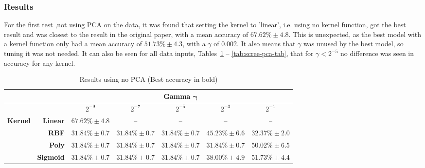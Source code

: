 \documentclass[12pt,a4paper,titlepage,twoside]{report}
\begin{document}
\subsubsection*{Results}
	For the first test ,not using PCA on the data, it was found that setting the kernel to 'linear', i.e. using no kernel function, got the best result and was closest to the result in the original paper, with a mean accuracy of $67.62\% \pm4.8$. This is unexpected, as the best model with a kernel function only had a mean accuracy of $51.73\% \pm4.3$, with a $\gamma$ of 0.002. It also means that $\gamma$ was unused by the best model, so tuning it was not needed. It can also be seen for all data inputs, Tables~\ref{tab:no-pca-tab} -- \ref{tab:scree-pca-tab}, that for $\gamma < 2^{-5}$ no difference was seen in accuracy for any kernel.\\
	\begin{table}[h]
		\centering
		\begin{tabular}{|ll|ccccc|}
			\hline
                                      &                                      &   			& \multicolumn{3}{c}{\textbf{Gamma $\boldsymbol{\gamma}$}} &   \\ \hline
                                      &                                      				& $2^{-9}$  		& $2^{-7}$       	& $2^{-5}$      	& $2^{-3}$			& $2^{-1}$ \\ \hline
			\multicolumn{1}{|l|}{\textbf{Kernel}} & \multicolumn{1}{r|}{\textbf{Linear}} 	& \boldmath$67.62\% \pm4.8$ 	& --  	& --				& --	  			& --			   \\
			\multicolumn{1}{|l|}{\textbf{}}       & \multicolumn{1}{r|}{\textbf{RBF}}    	& $31.84\% \pm0.7$ 	& $31.84\% \pm0.7$  & $31.84\% \pm0.7$  & $45.23\% \pm6.6$  & $32.37\% \pm2.0$ \\
			\multicolumn{1}{|l|}{\textbf{}}       & \multicolumn{1}{r|}{\textbf{Poly}}   	& $31.84\% \pm0.7$ 	& $31.84\% \pm0.7$  & $31.84\% \pm0.7$  & $31.84\% \pm0.7$  & $50.02\% \pm6.5$ \\
			\multicolumn{1}{|l|}{\textbf{}}       & \textbf{Sigmoid}                     	& $31.84\% \pm0.7$ 	& $31.84\% \pm0.7$  & $31.84\% \pm0.7$  & $38.00\% \pm4.9$  & $51.73\% \pm4.4$ \\ \hline
		\end{tabular}%
		\caption {Results using no PCA (Best accuracy in bold)} 
		\label{tab:no-pca-tab} 
	\end{table}
	
\end{document}
